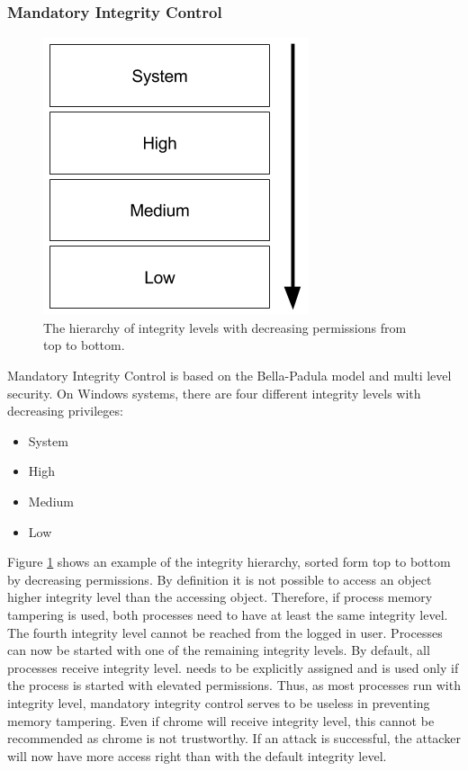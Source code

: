 \subsubsection{Mandatory Integrity Control}
\begin{figure}[h]
\centering
\includegraphics[scale=0.5]{sections/background/defenses/mic.png}
\caption{The hierarchy of integrity levels with decreasing permissions from top to bottom.}
\label{fig:mic}
\end{figure}
Mandatory Integrity Control is based on the Bella-Padula model and multi level security. On Windows systems, there are four different integrity levels with decreasing privileges: 
\begin{itemize}
\item System
\item High
\item Medium
\item Low
\end{itemize}
Figure \ref{fig:mic} shows an example of the integrity hierarchy, sorted form top to bottom by decreasing permissions. By definition it is not possible to access an object higher integrity level than the accessing object. Therefore, if process memory tampering is used, both processes need to have at least the same integrity level. The fourth integrity level  cannot be reached from the logged in user. Processes can now be started with one of the remaining integrity levels. By default, all processes receive  integrity level.  needs to be explicitly assigned and  is used only if the process is started with elevated permissions. Thus, as most processes run with  integrity level, mandatory integrity control serves to be useless in preventing memory tampering. Even if chrome will receive  integrity level, this cannot be recommended as chrome is not trustworthy. If an attack is successful, the attacker will now have more access right than with the default  integrity level.